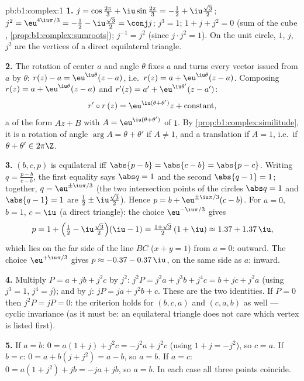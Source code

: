 \begin{solution}{pb:b1:complex:1}
\textbf{1.} $j = \cos\frac{2\pi}3 + \iu\sin\frac{2\pi}3 = -\frac12
+ \iu\frac{\sqrt3}2$; $j^2 = \eu^{4\iu\pi/3} = -\frac12 -
\iu\frac{\sqrt3}2 = \conj j$; $j^3 = 1$; $1 + j + j^2 = 0$ (sum of
the cube , \cref{prop:b1:complex:sumroots}); $j^{-1}
= j^2$ (since $j \cdot j^2 = 1$). On the unit circle, $1$, $j$,
$j^2$ are the vertices of a direct equilateral triangle.

\textbf{2.} The rotation of center $a$ and angle $\theta$ fixes $a$
and turns every vector issued from $a$ by $\theta$: $r(z) - a =
\eu^{\iu\theta}(z - a)$, i.e.\ $r(z) = a + \eu^{\iu\theta}(z - a)$.
Composing $r(z) = a + \eu^{\iu\theta}(z-a)$ and $r'(z) = a' +
\eu^{\iu\theta'}(z-a')$:
\[
r' \circ r\,(z) = \eu^{\iu(\theta + \theta')} z +
\text{constant},
\]
a  of the form $Az + B$ with $A = \eu^{\iu(\theta+\theta')}$ of
 $1$. By \cref{prop:b1:complex:similitude}, it is a rotation
of angle $\arg A = \theta + \theta'$ if $A \neq 1$, and a
translation if $A = 1$, i.e.\ if $\theta + \theta' \in 2\pi\Z$.

\textbf{3.} $(b, c, p)$ is equilateral iff $\abs{p - b} = \abs{c -
b} = \abs{p - c}$. Writing $q = \frac{p - b}{c - b}$, the first
equality says $\abs q = 1$ and the second $\abs{q - 1} = 1$;
together, $q = \eu^{\pm\iu\pi/3}$ (the two intersection points of
the circles $\abs q = 1$ and $\abs{q - 1} = 1$ are $\frac12 \pm
\iu\frac{\sqrt3}2$). Hence $p = b + \eu^{\pm\iu\pi/3}(c - b)$. For
$a = 0$, $b = 1$, $c = \iu$ (a direct triangle): the choice
$\eu^{-\iu\pi/3}$ gives
\[
p = 1 + \Bigl(\tfrac12 - \iu\tfrac{\sqrt3}2\Bigr)(\iu - 1)
= \tfrac{1 + \sqrt3}2\,(1 + \iu) \approx 1.37 + 1.37\,\iu ,
\]
which lies on the far side of the line $BC$ ($x + y = 1$) from $a
= 0$: outward. The choice $\eu^{+\iu\pi/3}$ gives $p \approx -0.37
- 0.37\,\iu$, on the same side as $a$: inward.

\textbf{4.} Multiply $P = a + jb + j^2c$ by $j^2$: $j^2 P = j^2 a +
j^3 b + j^4 c = b + jc + j^2 a$ (using $j^3 = 1$, $j^4 = j$); and
by $j$: $jP = ja + j^2 b + c$. These are the two identities. If $P
= 0$ then $j^2 P = jP = 0$: the criterion holds for $(b, c, a)$ and
$(c, a, b)$ as well --- cyclic invariance (as it must be: an
equilateral triangle does not care which vertex is listed first).

\textbf{5.} If $a = b$: $0 = a(1 + j) + j^2 c = -j^2 a + j^2 c$
(using $1 + j = -j^2$), so $c = a$. If $b = c$: $0 = a + b(j + j^2)
= a - b$, so $a = b$. If $a = c$: $0 = a(1 + j^2) + jb = -ja + jb$,
so $a = b$. In each case all three points coincide.


\end{solution}

